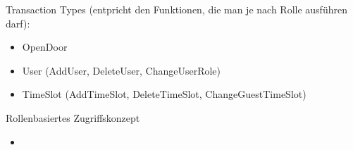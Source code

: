     Transaction Types (entpricht den Funktionen, die man je nach Rolle ausführen darf):
    \begin{itemize}[noitemsep]
        \item OpenDoor
        \item User (AddUser, DeleteUser, ChangeUserRole)
        \item TimeSlot (AddTimeSlot, DeleteTimeSlot, ChangeGuestTimeSlot)
    \end{itemize}
    
    Rollenbasiertes Zugriffskonzept
    \begin{itemize}[noitemsep]
        \item 
    \end{itemize}
    